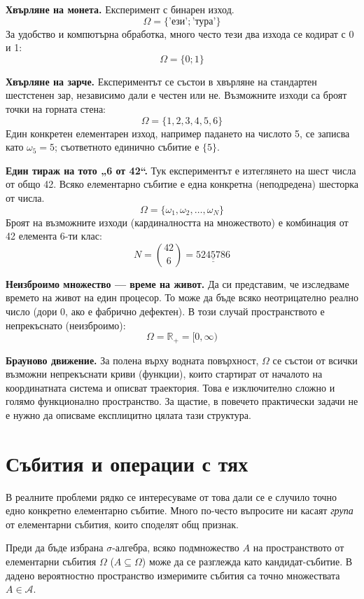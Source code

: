 \textbf{Хвърляне на монета.}
Експеримент с бинарен изход.
\[
\Omega = \{ \text{'ези'}; \text{'тура'} \}
\]
За удобство и компютърна обработка, много често тези два изхода се кодират с 0 и 1:
\[
\Omega = \{ 0; 1 \}
\]


\textbf{Хвърляне на зарче.}
Експериментът се състои в хвърляне на стандартен шестстенен зар, независимо дали е честен или не. Възможните изходи са броят точки на горната стена:
\[
\Omega = \{ 1, 2, 3, 4, 5, 6 \}
\]
Един конкретен елементарен изход, например падането на числото 5, се записва като $\omega_5 = 5$; съответното единично събитие е $\{5\}$.


\label{ex:01-3}\textbf{Един тираж на тото „6 от 42“.}
Тук експериментът е изтеглянето на шест числа от общо 42. Всяко елементарно събитие е една конкретна (неподредена) шесторка от числа.
\[
\Omega = \{ \omega_1, \omega_2, \dots, \omega_N \}
\]
Броят на възможните изходи (кардиналността на множеството) е комбинация от 42 елемента 6-ти клас:
\[
N = \binom{42}{6} = \underline{\underline{5245786}}
\]


\textbf{Неизброимо множество — време на живот.}
Да си представим, че изследваме времето на живот на един процесор. То може да бъде всяко неотрицателно реално число (дори 0, ако е фабрично дефектен). В този случай пространството е непрекъснато (неизброимо):
\[
\Omega = \mathbb{R}_+ = [0, \infty)
\]


\textbf{Брауново движение.}
За полена върху водната повърхност, $\Omega$ се състои от всички възможни непрекъснати криви (функции), които стартират от началото на координатната система и описват траектория. Това е изключително сложно и голямо функционално пространство. За щастие, в повечето практически задачи не е нужно да описваме експлицитно цялата тази структура.


\section{Събития и операции с тях}

В реалните проблеми рядко се интересуваме от това дали се е случило точно едно конкретно елементарно събитие. Много по-често въпросите ни касаят \emph{група} от елементарни събития, които споделят общ признак.

\begin{defn}
Преди да бъде избрана $\sigma$-алгебра, всяко подмножество $A$ на пространството от елементарни събития $\Omega$ ($A \subseteq \Omega$) може да се разглежда като кандидат-събитие. В дадено вероятностно пространство измеримите събития са точно множествата $A \in \mathcal{A}$.
\end{defn}

